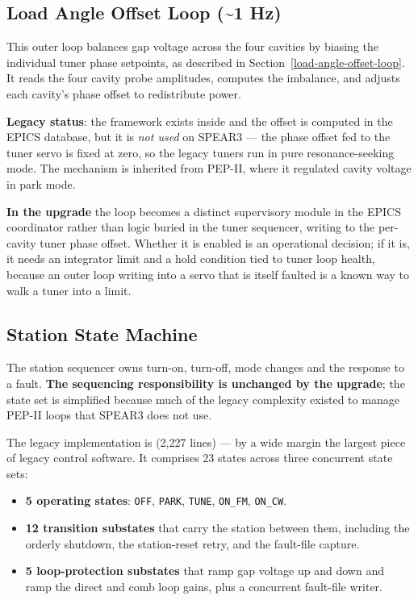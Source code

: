 \subsection{Load Angle Offset Loop (\textasciitilde1 Hz)}\label{load-angle-offset-loop-1-hz}

This outer loop balances gap voltage across the four cavities by biasing the individual tuner phase setpoints, as described in Section~\ref{load-angle-offset-loop}. It reads the four cavity probe amplitudes, computes the imbalance, and adjusts each cavity's phase offset to redistribute power.

\textbf{Legacy status}: the framework exists inside  and the offset is computed in the EPICS database, but it is \emph{not used} on SPEAR3 --- the phase offset fed to the tuner servo is fixed at zero, so the legacy tuners run in pure resonance-seeking mode. The mechanism is inherited from PEP-II, where it regulated cavity voltage in park mode.

\textbf{In the upgrade} the loop becomes a distinct supervisory module in the EPICS coordinator rather than logic buried in the tuner sequencer, writing to the per-cavity tuner phase offset. Whether it is enabled is an operational decision; if it is, it needs an integrator limit and a hold condition tied to tuner loop health, because an outer loop writing into a servo that is itself faulted is a known way to walk a tuner into a limit.

\subsection{Station State Machine}\label{station-state-machine}

The station sequencer owns turn-on, turn-off, mode changes and the response to a fault. \textbf{The sequencing responsibility is unchanged by the upgrade}; the state set is simplified because much of the legacy complexity existed to manage PEP-II loops that SPEAR3 does not use.

The legacy implementation is  (2,227 lines) --- by a wide margin the largest piece of legacy control software. It comprises 23 states across three concurrent state sets:

\begin{itemize}
\tightlist
\item
  \textbf{5 operating states}: \texttt{OFF}, \texttt{PARK}, \texttt{TUNE}, \texttt{ON\_FM}, \texttt{ON\_CW}.
\item
  \textbf{12 transition substates} that carry the station between them, including the orderly shutdown, the station-reset retry, and the fault-file capture.
\item
  \textbf{5 loop-protection substates} that ramp gap voltage up and down and ramp the direct and comb loop gains, plus a concurrent fault-file writer.
\end{itemize}

